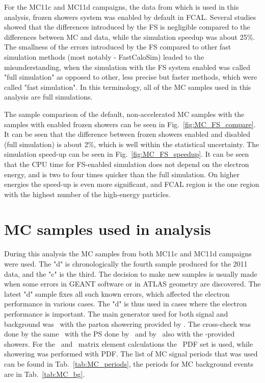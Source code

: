 For the MC11c and MC11d campaigns, the data from which is used in this analysis, frozen showers system was enabled by default in FCAL. Several studies showed that the differences introduced by the FS is negligible compared to the differences between MC and data, while the simulation speedup was about 25\%. The smallness of the errors introduced by the FS compared to other fast simulation methods (most notably - FastCaloSim) leaded to the misunderstanding, when the simulation with the FS system enabled was called "full simulation" as opposed to other, less precise but faster methods, which were called "fast simulation". In this terminology, all of the MC samples used in this analysis are full simulations.

The sample comparison of the default, non-accelerated MC samples with the samples with enabled frozen showers can be seen in Fig.~\ref{fig:MC_FS_compare}. It can be seen that the difference between frozen showers enabled and disabled (full simulation) is about 2\%, which is well within the statistical uncertainty. The simulation speed-up can be seen in Fig.~\ref{fig:MC_FS_speedup}. It can be seen that the CPU time for FS-enabled simulation does not depend on the electron energy, and is two to four times quicker than the full simulation. On higher energies the speed-up is even more significant, and FCAL region is the one region with the highest number of the high-energy particles.

\section{MC samples used in analysis}
\label{sec:MC_periods}

During this analysis the MC samples from both MC11c and MC11d campaigns were used. The "d" is chronologically the fourth sample produced for the 2011 data, and the "c" is the third. The decision to make new samples is usually made when some errors in GEANT software or in ATLAS geometry are discovered. The latest "d" sample fixes all such known errors, which affected the electron performance in various cases. The "d" is thus used in cases where the electron performance is important. The main generator used for both signal and background was \Powheg\ with the parton showering provided by \Pythia. The cross-check was done by the same \Powheg\ with the PS done by \Herwig\, and by \Mcatnlo\ also with the \Herwig-provided showers. For the
\Mcatnlo\ and \Powheg\ matrix element calculations the \pdfCteq\ PDF set is used, while showering was performed with \pdfCteql PDF. The list of MC signal periods that was used can be found in Tab.~\ref{tab:MC_periods}, the periods for MC background events are in Tab.~\ref{tab:MC_bg}.

